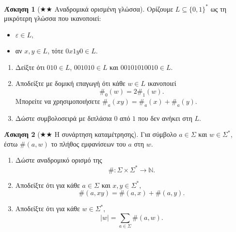 \documentclass[11pt,a4paper]{article}
\newcommand{\eps}{\varepsilon}
\theoremstyle{definition}
\newtheorem{question}{Άσκηση}
\begin{document}
\begin{question}[$\bigstar\bigstar$ Αναδρομικά ορισμένη γλώσσα]
Ορίζουμε $L\subseteq\{0,1\}^*$ ως τη μικρότερη γλώσσα που ικανοποιεί:
\begin{itemize}
\item $\eps\in L$,
\item αν $x,y\in L$, τότε $0x1y0\in L$.
\end{itemize}
\begin{enumerate}
\item Δείξτε ότι $010\in L$, $001010\in L$ και $00101010010\in L$.
\item Αποδείξτε με δομική επαγωγή ότι κάθε $w\in L$ ικανοποιεί
\[
\#_0(w)=2\#_1(w).
\]
Μπορείτε να χρησιμοποιήσετε $\#_a(xy)=\#_a(x)+\#_a(y)$.
\item Δώστε συμβολοσειρά με διπλάσια $0$ από $1$ που δεν ανήκει στη $L$.
\end{enumerate}
\end{question}

\begin{question}[$\bigstar\bigstar$ Η συνάρτηση καταμέτρησης]
Για σύμβολο $a\in\Sigma$ και $w\in\Sigma^*$, έστω $\#(a,w)$ το πλήθος εμφανίσεων του $a$ στη $w$.
\begin{enumerate}
\item Δώστε αναδρομικό ορισμό της
\[
\#:\Sigma\times\Sigma^*\to\mathbb N.
\]
\item Αποδείξτε ότι για κάθε $a\in\Sigma$ και $x,y\in\Sigma^*$,
\[
\#(a,xy)=\#(a,x)+\#(a,y).
\]
\item Αποδείξτε ότι για κάθε $w\in\Sigma^*$,
\[
|w|=\sum_{a\in\Sigma}\#(a,w).
\]
\end{enumerate}
\end{question}
\end{document}
